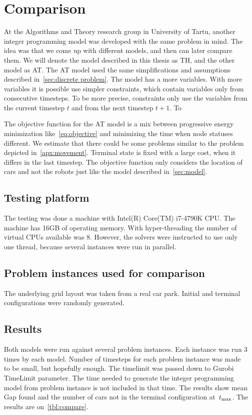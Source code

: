 \section{Comparison}
At the Algorithms and Theory research group in University of Tartu, another
integer programming model was developed with the same problem in mind. The
idea was that we come up with different models, and then can later compare
them. We will denote the model described in this thesis as TH, and the other
model as AT. The AT model used the same simplifications and assumptions described
in~\autoref{sec:discrete problem}. The model has a more variables. With more
variables it is possible use simpler constraints, which contain variables only
from consecutive timesteps. To be more precise, constraints only use the
variables from the current timestep $t$ and from the next timestep $t+1$. To

The objective function for the AT model is a mix between progressive
energy minimization like~\eqref{eq:objective} and minimizing the time when node
statuses different. We estimate that there could be some problems similar to the problem
depicted in~\autoref{apx:movement}. Terminal state is fixed with a large cost,
when it differs in the last timestep. The objective function only considers the
location of cars and not the robots just like the model described
in~\autoref{sec:model}.

\subsection{Testing platform}
The testing was done a machine with Intel(R) Core(TM) i7-4790K CPU.  The
machine has 16GB of operating memory. With hyper-threading the number of
virtual CPUs available was 8. However, the solvers were instructed to use only
one thread, because several instances were run in parallel.

\subsection{Problem instances used for comparison}
The underlying grid layout was taken from a real car park. Initial and terminal
configurations were randomly generated.

\subsection{Results}
Both models were run against several problem instances. Each instance was run 3
times by each model. Number of timesteps for each problem instance was made to
be small, but hopefully enough. The timelimit was passed down to Gurobi
TimeLimit parameter. The time needed to generate the integer programming model
from problem instance is not included in that time. The results show mean Gap
found and the number of cars not in the terminal configuration at~$t_{\max}$. The
results are on~\autoref{tbl:compare}.


